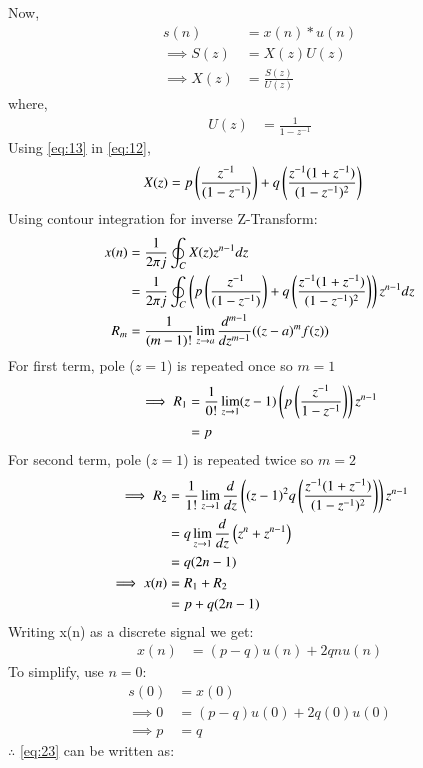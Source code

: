 \documentclass[journal,12pt,twocolumn]{IEEEtran}
\theoremstyle{remark}
\begin{document}
Now, 
\begin{align}
    s(n) &= x(n) \ast u(n)\\
    \implies S(z) &= X(z)U(z)\\
    \implies X(z) &= \frac{S(z)}{U(z)}\label{eq:12}
\end{align}
where,
\begin{align}
    U(z) &= \frac{1}{1 - z^{-1}}\label{eq:13}
\end{align}
Using \eqref{eq:13} in \eqref{eq:12},
\begin{align}
    X(z) &= p\left(\frac{z^{-1}}{(1-z^{-1})}\right) + q\left(\frac{z^{-1}(1 + z^{-1})}{(1-z^{-1})^2}\right)
\end{align}
Using contour integration for inverse Z-Transform:
\begin{align}
    x(n) &= \frac{1}{2\pi j} \oint_C X(z) z^{n-1}dz\\
    &= \frac{1}{2 \pi j} \oint_C  \left(p\left(\frac{z^{-1}}{(1-z^{-1})}\right) + q\left(\frac{z^{-1}(1 + z^{-1})}{(1-z^{-1})^2}\right)\right)z^{n-1}dz\\
    R_m &= \frac{1}{(m-1)!} \lim_{z \to a} \frac{d^{m-1}}{dz^{m-1}}((z-a)^mf(z))
\end{align}
For first term, pole ($z = 1$) is repeated once so $m=1$
\begin{align}
    \implies R_1 &= \frac{1}{0!} \lim_{z \to 1}(z-1)\left(p\left(\frac{z^{-1}}{1-z^{-1}}\right)\right)z^{n-1}\\
    &= p
\end{align}
For second term, pole ($z = 1$) is repeated twice so $m=2$
\begin{align}
    \implies R_2 &= \frac{1}{1!} \lim_{z \to 1}\frac{d}{dz}\left((z-1)^2q\left(\frac{z^{-1}(1 + z^{-1})}{(1-z^{-1})^2}\right)\right)z^{n-1}\\
    &= q\lim_{z \to 1}\frac{d}{dz}\left(z^{n} + z^{n-1}\right)\\
    &= q(2n-1)\\
    \implies x(n) &= R_1 + R_2\\
    &= p + q(2n-1)
\end{align}
Writing x(n) as a discrete signal we get:
\begin{align}
    x(n) &= (p-q)u(n) + 2qnu(n)\label{eq:23}
\end{align}
To simplify, use $n=0$:
\begin{align}
    s(0)&=x(0)\\
    \implies 0 &= (p-q)u(0) +2q(0)u(0)\\
    \implies p &= q
\end{align}
$\therefore$ \eqref{eq:23} can be written as:
\end{document}
